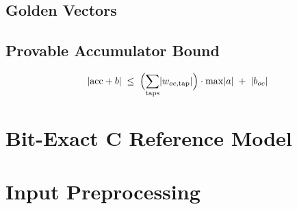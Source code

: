 \subsection{Golden Vectors}
\label{sec:golden}

\subsection{Provable Accumulator Bound}
\label{sec:acc-bound}
%
%
%
\begin{equation}
  \lvert \mathrm{acc} + b \rvert \;\le\;
  \Bigl( \sum_{\mathrm{taps}} \lvert w_{oc,\mathrm{tap}} \rvert \Bigr)
  \cdot \max \lvert a \rvert \;+\; \lvert b_{oc} \rvert
  \label{eq:acc-bound}
\end{equation}
%

\section{Bit-Exact C Reference Model}
\label{sec:c-model}

\section{Input Preprocessing}
\label{sec:preproc}

